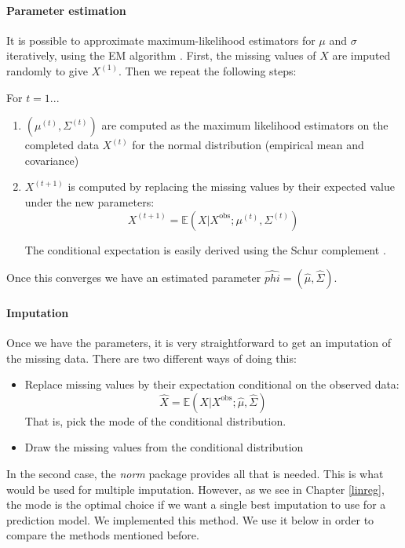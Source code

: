 \documentclass[12pt, a4paper]{memoir}
\begin{document}
\paragraph{Parameter estimation}
It is possible to approximate maximum-likelihood estimators for $\mu$ and $\sigma$ iteratively, using the EM algorithm \cite{EM} \cite{em_normal_fit}. First, the missing values of $X$ are imputed randomly to give $X^{(1)}$. Then we repeat the following steps:

For $t=1...$
\begin{enumerate}
\item $(\mu^{(t)}, \Sigma^{(t)})$ are computed as the maximum likelihood estimators on the completed data $X^{(t)}$ for the normal distribution (empirical mean and covariance)
\item $X^{(t+1)}$ is computed by replacing the missing values by their expected value under the new parameters: 
$$X^{(t+1)} = \mathbb{E}(X \vert X^{\text{obs}} ; \mu^{(t)}, \Sigma^{(t)})$$

The conditional expectation is easily derived using the Schur complement \cite{norm_schur}.
\end{enumerate}

Once this converges we have an estimated parameter $\hat{phi} = (\hat{\mu}, \hat{\Sigma})$.

\paragraph{Imputation}
Once we have the parameters, it is very straightforward to get an imputation of the missing data. There are two different ways of doing this:
\begin{itemize}
\item Replace missing values by their expectation conditional on the observed data: 
$$\hat{X} = \mathbb{E}(X \vert X^{\text{obs}} ; \hat{\mu}, \hat{\Sigma})$$
That is, pick the mode of the conditional distribution.
\item Draw the missing values from the conditional distribution
\end{itemize}

In the second case, the \emph{norm} package provides all that is needed. This is what would be used for multiple imputation. However, as we see in Chapter \ref{linreg}, the mode is the optimal choice if we want a single best imputation to use for a prediction model. We implemented this method. We use it below in order to compare the methods mentioned before.
\end{document}
